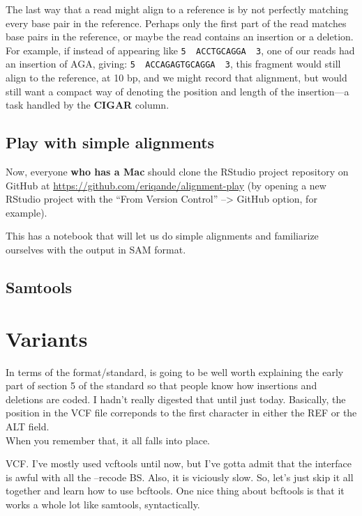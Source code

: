 \documentclass[]{krantz}
\begin{document}
The last way that a read might align to a reference is by not perfectly matching
every base pair in the reference. Perhaps only the first part of the read matches
base pairs in the reference, or maybe the read contains an insertion or a deletion.
For example, if instead of appearing like \texttt{5\textquotesingle{}\ \ ACCTGCAGGA\ \ 3\textquotesingle{}}, one of our reads
had an insertion of AGA, giving: \texttt{5\textquotesingle{}\ \ ACCAGAGTGCAGGA\ \ 3\textquotesingle{}}, this fragment would
still align to the reference, at 10 bp, and we might record that alignment,
but would still want a compact way of denoting the position and length of the
insertion---a task handled by the \textbf{CIGAR} column.

\hypertarget{play-with-simple-alignments}{%
\subsection{Play with simple alignments}\label{play-with-simple-alignments}}

Now, everyone \textbf{who has a Mac} should clone the RStudio project repository on GitHub at \url{https://github.com/eriqande/alignment-play}
(by opening a new RStudio project with the ``From Version Control'' --\textgreater{} GitHub option, for example).

This has a notebook that will let us do simple alignments and familiarize
ourselves with the output in SAM format.

\hypertarget{samtools}{%
\subsection{Samtools}\label{samtools}}

\hypertarget{variants}{%
\section{Variants}\label{variants}}

In terms of the format/standard, is going to be well worth explaining the early
part of section 5 of the standard so that people know how insertions and deletions
are coded. I hadn't really digested that until just today. Basically, the position
in the VCF file correponds to the first character in either the REF or the ALT field.\\
When you remember that, it all falls into place.

VCF. I've mostly used vcftools until now, but I've gotta admit that the interface
is awful with all the --recode BS. Also, it is viciously slow. So, let's just
skip it all together and learn how to use bcftools. One nice thing about
bcftools is that it works a whole lot like samtools, syntactically.
\end{document}
